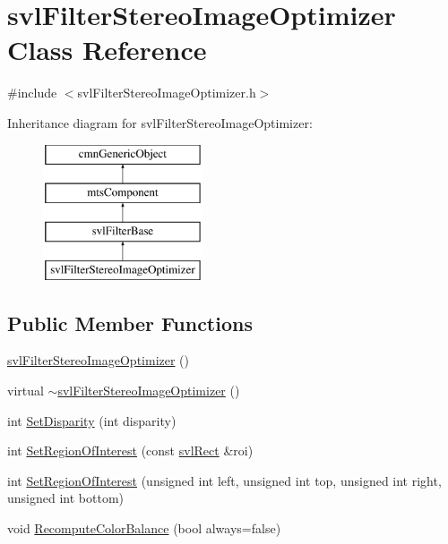 \hypertarget{classsvl_filter_stereo_image_optimizer}{}\section{svl\+Filter\+Stereo\+Image\+Optimizer Class Reference}
\label{classsvl_filter_stereo_image_optimizer}


{\ttfamily \#include $<$svl\+Filter\+Stereo\+Image\+Optimizer.\+h$>$}

Inheritance diagram for svl\+Filter\+Stereo\+Image\+Optimizer\+:\begin{figure}[H]
\begin{center}
\leavevmode
\includegraphics[height=4.000000cm]{d6/d9d/classsvl_filter_stereo_image_optimizer}
\end{center}
\end{figure}
\subsection*{Public Member Functions}
\begin{DoxyCompactItemize}
\item 
\hyperlink{classsvl_filter_stereo_image_optimizer_a260d8b3099640f3a6f122348a5e22f51}{svl\+Filter\+Stereo\+Image\+Optimizer} ()
\item 
virtual \hyperlink{classsvl_filter_stereo_image_optimizer_a64c9ab2ed17454c5d97ec866d0fd0e1a}{$\sim$svl\+Filter\+Stereo\+Image\+Optimizer} ()
\item 
int \hyperlink{classsvl_filter_stereo_image_optimizer_a894d73594bef3b793f2c009ad061f137}{Set\+Disparity} (int disparity)
\item 
int \hyperlink{classsvl_filter_stereo_image_optimizer_acbf21f003860de77abbbdecf5bf96be5}{Set\+Region\+Of\+Interest} (const \hyperlink{structsvl_rect}{svl\+Rect} \&roi)
\item 
int \hyperlink{classsvl_filter_stereo_image_optimizer_acb681399e8cad49db480daa06f81dd14}{Set\+Region\+Of\+Interest} (unsigned int left, unsigned int top, unsigned int right, unsigned int bottom)
\item 
void \hyperlink{classsvl_filter_stereo_image_optimizer_ad303db544f6e95fbbdd64639cadc0762}{Recompute\+Color\+Balance} (bool always=false)
\end{DoxyCompactItemize}
